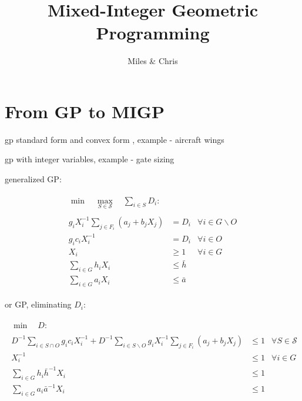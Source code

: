 \documentclass[]{article}
\title{Mixed-Integer Geometric Programming}
\author{Miles \& Chris}
\date{}
\begin{document}
\maketitle


\section{From GP to MIGP}

gp standard form and convex form \cite{boyd07}, example - aircraft wings \cite{hoburg14a}

gp with integer variables, example - gate sizing \cite{boyd07}

generalized GP:

\begin{subequations}
\begin{gather}
\begin{align}
\min \quad \max_{S \in \mathcal{S}} \quad
\sum_{i \in S} D_i :
\end{align}
\\
\begin{align}
g_i X_i^{-1} \sum_{j \in F_i} \left( a_j + b_j X_j \right) 
& = D_i
& \forall i \in G \backslash O
\\
g_i c_i X_i^{-1} 
& = D_i 
& \forall i \in O
\\
X_i
& \geq 1
& \forall i \in G
\\
\sum_{i \in G} h_i X_i 
& \leq \bar{h}
\\
\sum_{i \in G} a_i X_i 
& \leq \bar{a}
\end{align}
\end{gather}
\end{subequations}

or GP, eliminating $D_i$:

\begin{subequations}
\begin{gather}
\begin{align}
\min \quad D :
\end{align}
\\
\begin{align}
D^{-1} \sum_{i \in S \cap O} g_i c_i X_i^{-1} + D^{-1} \sum_{i \in S \backslash O} g_i X_i^{-1} \sum_{j \in F_i} \left( a_j + b_j X_j \right)
& \leq 1
& \forall S \in \mathcal{S}
\\
X_i^{-1}
& \leq 1
& \forall i \in G
\\
\sum_{i \in G} h_i \bar{h}^{-1} X_i 
& \leq 1
\\
\sum_{i \in G} a_i \bar{a}^{-1} X_i 
& \leq 1
\end{align}
\end{gather}
\end{subequations}
\end{document}
